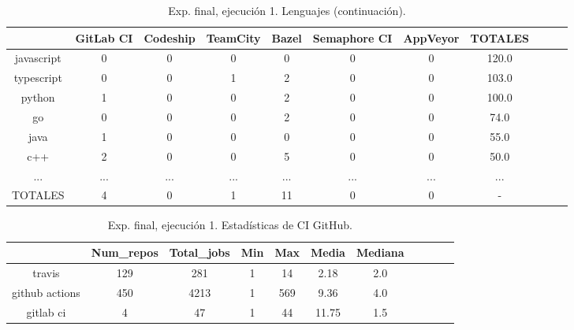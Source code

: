 \begin{table}[h]
  \centering
  \caption{Exp. final, ejecución 1. Lenguajes (continuación).}
  \label{tab:tabla_f1_2b}

\begin{footnotesize}
\renewcommand{\arraystretch}{1.5} %
\begin{tabular}{ccccccccccc}
  \hline
  {} &  GitLab CI &  Codeship &  TeamCity &  Bazel &  Semaphore CI &  AppVeyor &  TOTALES \\
  \hline
  javascript       &        0 &         0 &         0 &      0 &             0 &         0 &    120.0 \\
  typescript       &        0 &         0 &         1 &      2 &             0 &         0 &    103.0 \\
  python           &        1 &         0 &         0 &      2 &             0 &         0 &    100.0 \\
  go               &        0 &         0 &         0 &      2 &             0 &         0 &     74.0 \\
  java             &        1 &         0 &         0 &      0 &             0 &         0 &     55.0 \\
  c++              &        2 &         0 &         0 &      5 &             0 &         0 &     50.0 \\
  ...              &      ... &       ... &       ... &    ... &           ... &       ... &      ... \\
  TOTALES          &        4 &         0 &         1 &     11 &             0 &         0 &        - \\
 \end{tabular}
\end{footnotesize}

\end{table}

\begin{table}[h]
  \centering
  \caption{Exp. final, ejecución 1. Estadísticas de CI GitHub.}
  \label{tab:tabla_f1_3}

\begin{footnotesize}
\renewcommand{\arraystretch}{1.5} %
\begin{tabular}{ccccccccccc}
  \hline
  {} &  Num\_repos &  Total\_jobs &  Min &  Max &  Media &  Mediana \\
  \hline
  travis         &        129 &         281 &    1 &   14 &   2.18 &      2.0 \\
  github actions &        450 &        4213 &    1 &  569 &   9.36 &      4.0 \\
  gitlab ci      &          4 &          47 &    1 &   44 &  11.75 &      1.5 \\
 \end{tabular}
\end{footnotesize}

\end{table}

